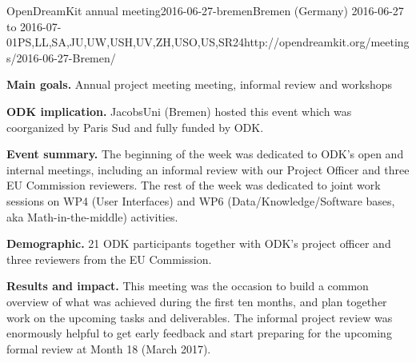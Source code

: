 \begin{event}{OpenDreamKit annual meeting}{2016-06-27-bremen}{Bremen (Germany) 2016-06-27 to 2016-07-01}{PS,LL,SA,JU,UW,USH,UV,ZH,USO,US,SR}{24}{http://opendreamkit.org/meetings/2016-06-27-Bremen/}

  \textbf{Main goals.} Annual project meeting meeting, informal review and workshops

  \textbf{ODK implication.} JacobsUni (Bremen) hosted this event which
  was coorganized by Paris Sud and fully funded by ODK.

  \textbf{Event summary.} The beginning of the week was dedicated to
  ODK’s open and internal meetings, including an informal review with
  our Project Officer and three EU Commission reviewers. The rest of
  the week was dedicated to joint work sessions on WP4 (User
  Interfaces) and WP6 (Data/Knowledge/Software bases, aka
  Math-in-the-middle) activities.

  \textbf{Demographic.} 21 ODK participants together with ODK's
  project officer and three reviewers from the EU Commission.

  \textbf{Results and impact.} This meeting was the occasion to build
  a common overview of what was achieved during the first ten months,
  and plan together work on the upcoming tasks and deliverables. The
  informal project review was enormously helpful to get early feedback
  and start preparing for the upcoming formal review at Month 18
  (March 2017).


\end{event}
